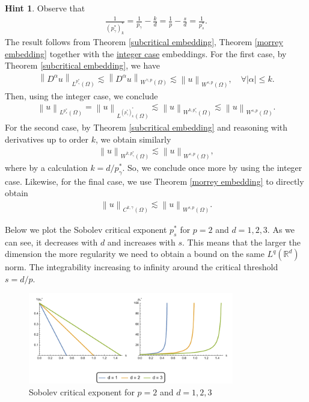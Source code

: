\documentclass[
    a4paper,
    DIV=14,
    abstract=true,
    numbers=noenddot
]
{scrartcl}
\theoremstyle{definition}
\newtheorem*{hint}{Hint}
\renewcommand{\norm}[1]{\left\lVert #1 \right\rVert}\renewcommand{\abs}[1]{\left| #1 \right|}
\newcommand{\R}{\mathbb{R}}
\begin{document}
\begin{hint}
    Observe that
    \begin{align*}
        \frac{1}{{(p_\gamma ^*)}_k^*}=\frac{1}{p_\gamma }-\frac{k}{d}=\frac{1}{p}-\frac{s}{d}= \frac{1}{p_s^*}.
    \end{align*}
    The result follows from Theorem \ref{subcritical embedding},  Theorem \ref{morrey embedding} together with the \href{https://nowheredifferentiable.com/2023-07-12-PDEs-3-Sobolev_spaces/#est32:~:text=three%20results%20gives-,Theorem%2013,-(Rellich%2DKondrachov).%20Let}{integer case} embeddings. For the first case, by Theorem \ref{subcritical embedding}, we have
    \begin{align*}
        \norm{D^\alpha u}_{L^{p_\gamma ^*}(\Omega )}\lesssim \norm{D^\alpha u}_{W^{\gamma ,p}(\Omega )} \lesssim \norm{u}_{W^{s,p}(\Omega )}, \quad \forall \abs{\alpha}\leq k.
    \end{align*}
    Then, using the integer case, we conclude
    \begin{align*}
        \norm{u}_{L^{p_s^*}(\Omega )}=\norm{u}_{L^{{(p_\gamma ^*)}_k ^*}(\Omega )}\lesssim \norm{u}_{W^{k,p_\gamma ^*}(\Omega )}\lesssim \norm{u}_{W^{s,p}(\Omega )}.
    \end{align*}
    For the second case, by Theorem \ref{subcritical embedding} and reasoning with derivatives up to order $k$, we obtain similarly
    \begin{align*}
        \norm{u}_{W^{k,p_\gamma ^*}(\Omega )}\lesssim \norm{u}_{W^{s,p}(\Omega )},
    \end{align*}
    where by a calculation $k = d / p_\gamma ^*$. So, we conclude once more by using the integer case. Likewise, for the final case, we use Theorem \ref{morrey embedding} to directly obtain
    \begin{align*}
        \norm{u}_{C^{k,\gamma}(\Omega )}\lesssim \norm{u}_{W^{s,p}(\Omega )}.
    \end{align*}
\end{hint}
Below we plot the Sobolev critical exponent $p_s^*$ for $p=2$ and $d=1,2,3$. As we can see, it decreases with $d$ and increases with $s$. This means that the larger the dimension the more regularity we need to obtain a bound on the same $L^q(\R^d)$ norm. The integrability increasing to infinity around the critical threshold $s=d/p$.
\begin{figure}[htbp]
    \centering
    \includegraphics[width=0.8\textwidth]{regularity_coefficient.pdf}
    \caption{Sobolev critical exponent for $p=2$ and $d=1,2,3$  }
    \label{fig:regularity_coefficient}
\end{figure}
\end{document}
